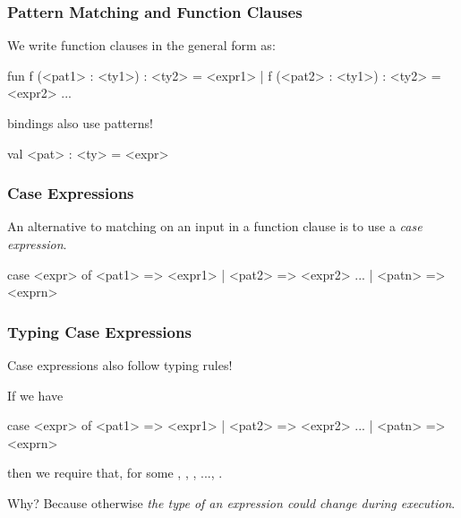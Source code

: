\documentclass[aspectratio=169]{beamer}
\begin{document}
\begin{frame}[fragile]
  \frametitle{Pattern Matching and Function Clauses}

  We write function clauses in the general form as:
  
  \begin{codeblock}
    fun f (<pat1> : <ty1>) : <ty2> = <expr1> 
      | f (<pat2> : <ty1>) : <ty2> = <expr2>
      ...
  \end{codeblock}

  \vspace{\fill}

   bindings also use patterns!

  \begin{codeblock}
    val <pat> : <ty> = <expr>
  \end{codeblock}
\end{frame}

\begin{frame}[fragile]
  \frametitle{Case Expressions}

  An alternative to matching on an input in a function clause is to
  use a \textit{case expression}.

  \begin{codeblock}
    case <expr> of
      <pat1> => <expr1>
    | <pat2> => <expr2>
    ...
    | <patn> => <exprn> 
  \end{codeblock}

  \vspace{\fill}

\end{frame}

\begin{frame}[fragile]
  \frametitle{Typing Case Expressions}

  Case expressions also follow typing rules!

  \vspace{\fill}

  If we have
  \begin{codeblock}
    case <expr> of
      <pat1> => <expr1>
    | <pat2> => <expr2>
    ...
    | <patn> => <exprn> 
  \end{codeblock}
  then we require that, for some , , , ..., . 

  \vspace{\fill}

  Why? Because otherwise \textit{the type of an expression could change during execution}.
\end{frame}
\end{document}
